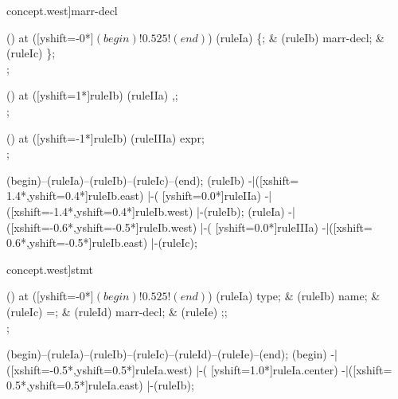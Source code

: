 \begin{syntax}[[xshift=22mm]concept.west]{marr-decl}
  
  \node[sequence,column sep=2.0cm] () at ([yshift=-0*\syntaxruledist]$(begin)!0.525!(end)$) {
    \node[terminal]       (ruleIa) {\{};
    &
    \node[nonterminal]    (ruleIb) {marr-decl};
    &
    \node[terminal]       (ruleIc) {\}};
    \\
  };
  
  \node[sequence] () at ([yshift=1*\syntaxruledist]ruleIb) {
    \node[terminal]    (ruleIIa) {,};
    \\
  };
  
  \node[sequence] () at ([yshift=-1*\syntaxruledist]ruleIb) {
    \node[nonterminal]    (ruleIIIa) {expr};
    \\
  };
  
  \draw[path] (begin)--(ruleIa)--(ruleIb)--(ruleIc)--(end);
  \draw[path] (ruleIb)
            -|([xshift= 1.4*\syntaxruledist,yshift=0.4*\syntaxruledist]ruleIb.east)
            |-(                            [yshift=0.0*\syntaxruledist]ruleIIa)
            -|([xshift=-1.4*\syntaxruledist,yshift=0.4*\syntaxruledist]ruleIb.west)
            |-(ruleIb);
  \draw[path] (ruleIa)
            -|([xshift=-0.6*\syntaxruledist,yshift=-0.5*\syntaxruledist]ruleIb.west)
            |-(                            [yshift=0.0*\syntaxruledist]ruleIIIa)
            -|([xshift= 0.6*\syntaxruledist,yshift=-0.5*\syntaxruledist]ruleIb.east)
            |-(ruleIc);
\end{syntax}

\begin{syntax}[[xshift=22mm]concept.west]{stmt}
  
  \node[sequence,column sep=1.0cm] () at ([yshift=-0*\syntaxruledist]$(begin)!0.525!(end)$) {
    \node[nonterminal]    (ruleIa) {type};
    &
    \node[terminal]       (ruleIb) {name};
    &
    \node[terminal]       (ruleIc) {=};
    &
    \node[nonterminal]    (ruleId) {marr-decl};
    &
    \node[terminal]       (ruleIe) {;};
    \\
  };
  
  \draw[path] (begin)--(ruleIa)--(ruleIb)--(ruleIc)--(ruleId)--(ruleIe)--(end);
  \draw[path] (begin)
            -|([xshift=-0.5*\syntaxruledist,yshift=0.5*\syntaxruledist]ruleIa.west)
            |-(                            [yshift=1.0*\syntaxruledist]ruleIa.center)
            -|([xshift= 0.5*\syntaxruledist,yshift=0.5*\syntaxruledist]ruleIa.east)
            |-(ruleIb);
\end{syntax}

